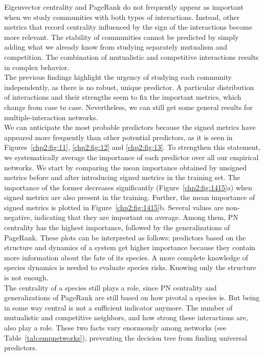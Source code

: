 Eigenvector centrality and PageRank do not frequently appear as important when we study communities with both types of interactions. Instead, other metrics that record centrality influenced by the sign of the interactions become more relevant. The stability of communities cannot be predicted by simply adding what we already know from studying separately mutualism and competition. The combination of mutualistic and competitive interactions results in complex behavior. \\

The previous findings highlight the urgency of studying each community independently, as there is no robust, unique predictor. A particular distribution of interactions and their strengths seem to fix the important metrics, which change from case to case.   Nevertheless, we can still get some general results for multiple-interaction networks. \\

We can anticipate the most probable predictors because the signed metrics have appeared more frequently than other potential predictors, as it is seen in Figures~\ref{chp2:fig:11}, \ref{chp2:fig:12} and \ref{chp2:fig:13}. To strengthen this statement, we systematically average the importance of each predictor over all our empirical networks. We start by comparing the mean importance obtained by unsigned metrics before and after introducing signed metrics in the training set. The importance of the former decreases significantly (Figure~\ref{chp2:fig:1415}a) when signed metrics are also present in the training. Further, the mean importance of signed metrics is plotted in Figure~\ref{chp2:fig:1415}b. Several values are non-negative, indicating that they are important on average. Among them, PN centrality has the highest importance, followed by the generalizations of PageRank. These plots can be interpreted as follows: predictors based on the structure and dynamics of a system get higher importance because they contain more information about the fate of its species. A more complete knowledge of species dynamics is needed to evaluate species risks. Knowing only the structure is not enough.\\

The centrality of a species still plays a role, since  PN centrality and generalizations of PageRank are still based on how pivotal a species is. But being in some way central is not a sufficient indicator anymore. The number of mutualistic and competitive neighbors, and how strong these interactions are, also play a role. These two facts vary enormously among networks (see Table~\ref{tab:empnetworks}), preventing the decision tree from finding universal predictors.\\

